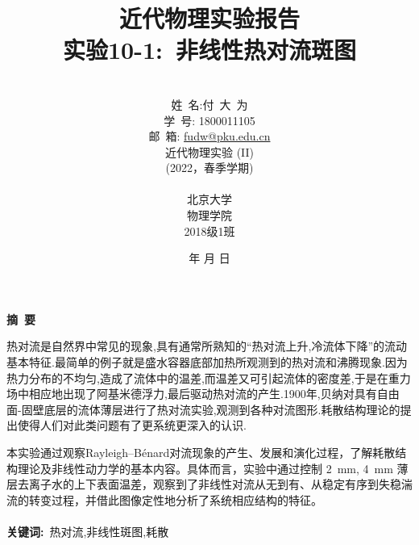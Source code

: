 \documentclass[a4paper]{article}
\begin{document}
\renewcommand{\contentsname}{目\ 录}
\renewcommand{\appendixname}{附录}
\renewcommand{\appendixpagename}{附录}
\renewcommand{\refname}{参考文献} 
\renewcommand{\figurename}{图}
\renewcommand{\tablename}{表}
\renewcommand{\today}{\number\year 年 \number\month 月 \number\day 日}
\newcommand{\refeq}[1]{\textbf{Eq.(\ref{#1})}}
\newcommand*{\circled}[1]{\lower.7ex\hbox{\tikz\draw (0pt, 0pt)%
    circle (.5em) node {\makebox[1em][c]{\small #1}};}}
    
\title{{\Huge 近代物理实验报告{\large\linebreak\\}}{\Large 实验10-1:\ 非线性热对流斑图\linebreak\linebreak}}
\author{\\姓\ 名:付\ 大\ 为\\
学\ 号: 1800011105\\
邮\ 箱: \url{fudw@pku.edu.cn}\\
近代物理实验 (II)\\
(2022，春季学期)\\\\
北京大学\\
物理学院\\
2018级1班}
\date{\today}
\maketitle
\newpage

\begin{center}
{\Large\bf{摘\ 要\\}}
\end{center}

热对流是自然界中常见的现象,具有通常所熟知的“热对流上升,冷流体下降”的流动基本特征.最简单的例子就是盛水容器底部加热所观测到的热对流和沸腾现象.因为热力分布的不均匀,造成了流体中的温差,而温差又可引起流体的密度差,于是在重力场中相应地出现了阿基米德浮力,最后驱动热对流的产生.1900年,贝纳对具有自由面-固壁底层的流体薄层进行了热对流实验,观测到各种对流图形.耗散结构理论的提出使得人们对此类问题有了更系统更深入的认识.

本实验通过观察Rayleigh–Bénard对流现象的产生、发展和演化过程，了解耗散结构理论及非线性动力学的基本内容。具体而言，实验中通过控制 \SI{2}{\mm}, \SI{4}{\mm} 薄层去离子水的上下表面温差，观察到了非线性对流从无到有、从稳定有序到失稳湍流的转变过程，并借此图像定性地分析了系统相应结构的特征。
\\\\
{\bf{关键词}:}\ 热对流,非线性斑图,耗散
\end{document}
